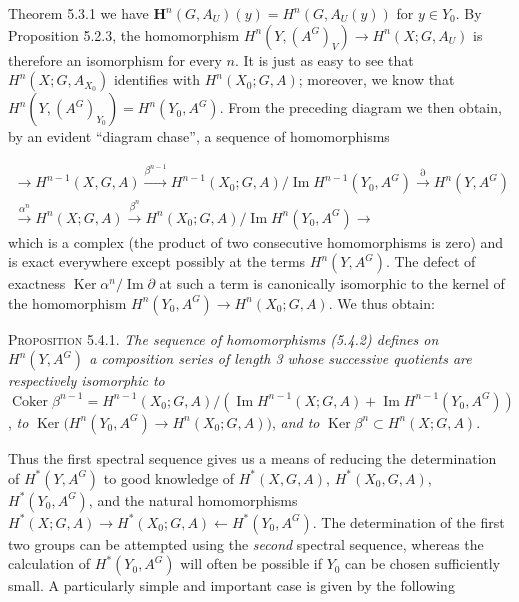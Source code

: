 \clearpage
{}

\noindent Theorem 5.3.1 we have
$\mathbf H^n(G,A_U)(y)=H^n(G,A_U(y))$ for $y\in Y_0$. By Proposition
5.2.3, the homomorphism
$H^n(Y,(A^G)_V)\to H^n(X;G,A_U)$ is therefore an isomorphism for
every $n$. It is just as easy to see that $H^n(X;G,A_{X_0})$ identifies with
$H^n(X_0;G,A)$; moreover, we know that
$H^n(Y,(A^G)_{Y_0})=H^n(Y_0,A^G)$. From the preceding diagram we then obtain,
by an evident ``diagram chase'', a sequence of homomorphisms

\[
\tag{5.4.2}
\begin{gathered}
{}\to H^{n-1}(X,G,A)
 \xrightarrow{\beta^{n-1}}
 H^{n-1}(X_0;G,A)/\operatorname{Im}H^{n-1}(Y_0,A^G)
 \xrightarrow{\partial} H^n(Y,A^G)\\[-0.2em]
 \xrightarrow{\alpha^n}H^n(X;G,A)
 \xrightarrow{\beta^n}
 H^n(X_0;G,A)/\operatorname{Im}H^n(Y_0,A^G)
 \to
\end{gathered}
\]
which is a complex (the product of two consecutive homomorphisms is zero) and
is exact everywhere except possibly at the terms $H^n(Y,A^G)$. The defect of
exactness $\operatorname{Ker}\alpha^n/\operatorname{Im}\partial$ at such a
term is canonically isomorphic to the kernel of the homomorphism
$H^n(Y_0,A^G)\to H^n(X_0;G,A)$. We thus obtain:

\textsc{Proposition 5.4.1.} \textit{The sequence of homomorphisms
\textup{(5.4.2)} defines on $H^n(Y,A^G)$ a composition series of length \textup{3} whose
successive quotients are respectively isomorphic to}
$\operatorname{Coker}\beta^{n-1}=H^{n-1}(X_0;G,A)/(\operatorname{Im}H^{n-1}(X;G,A)+\operatorname{Im}H^{n-1}(Y_0,A^G))$,
\textit{to}
$\operatorname{Ker}\bigl(H^n(Y_0,A^G)\to H^n(X_0;G,A)\bigr)$,
\textit{and to} $\operatorname{Ker}\beta^n\subset H^n(X;G,A)$.

Thus the first spectral sequence gives us a means of reducing the
determination of $H^*(Y,A^G)$ to good knowledge of $H^*(X,G,A)$,
$H^*(X_0,G,A)$, $H^*(Y_0,A^G)$, and the natural homomorphisms
$H^*(X;G,A)\to H^*(X_0;G,A)\leftarrow H^*(Y_0,A^G)$.
The determination of the first two groups can be attempted using the
\textit{second} spectral sequence, whereas the calculation of $H^*(Y_0,A^G)$
will often be possible if $Y_0$ can be chosen sufficiently small. A
particularly simple and important case is given by the following

